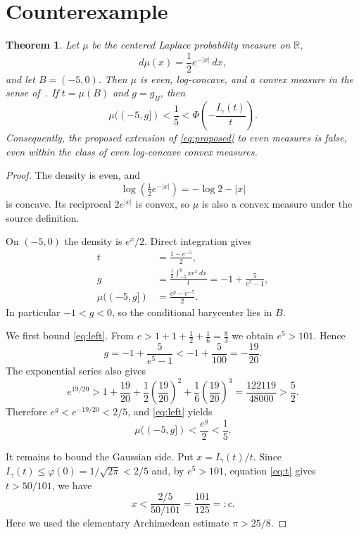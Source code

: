 \documentclass[11pt,a4paper]{article}
\newtheorem{theorem}{Theorem}
\newcommand{\R}{\mathbb R}
\newcommand{\PhiG}{\Phi}
\newcommand{\phig}{\varphi}
\begin{document}
\section{Counterexample}

\begin{theorem}\label{thm:main}
Let $\mu$ be the centered Laplace probability measure on $\R$,
\[
 d\mu(x)=\frac12 e^{-|x|}\,dx,
\]
and let $B=(-5,0)$.  Then $\mu$ is even, log-concave, and a convex measure in
the sense of~\cite{FLLMT}.  If $t=\mu(B)$ and $g=g_B$, then
\[
 \mu((-5,g])<\frac15<
 \PhiG\!\left(-\frac{I_\gamma(t)}{t}\right).
\]
Consequently, the proposed extension of \eqref{eq:proposed} to even measures
is false, even within the class of even log-concave convex measures.
\end{theorem}

\begin{proof}
The density is even, and
\[
 \log\!\left(\tfrac12e^{-|x|}\right)=-\log2-|x|
\]
is concave.  Its reciprocal $2e^{|x|}$ is convex, so $\mu$ is also a convex
measure under the source definition.

On $(-5,0)$ the density is $e^x/2$.  Direct integration gives
\begin{align}
 t&=\frac{1-e^{-5}}2,\label{eq:t}\\
 g&=\frac{\frac12\int_{-5}^{0}xe^x\,dx}{t}
   =-1+\frac{5}{e^5-1},\label{eq:g}\\
 \mu((-5,g])&=\frac{e^g-e^{-5}}2.\label{eq:left}
\end{align}
In particular $-1<g<0$, so the conditional barycenter lies in $B$.

We first bound \eqref{eq:left}.  From
$e>1+1+\frac12+\frac16=\frac83$ we obtain $e^5>101$.  Hence
\[
 g=-1+\frac5{e^5-1}< -1+\frac5{100}=-\frac{19}{20}.
\]
The exponential series also gives
\[
 e^{19/20}>
 1+\frac{19}{20}+\frac12\left(\frac{19}{20}\right)^2
 +\frac16\left(\frac{19}{20}\right)^3
 =\frac{122119}{48000}>\frac52.
\]
Therefore $e^g<e^{-19/20}<2/5$, and \eqref{eq:left} yields
\begin{equation}\label{eq:leftbound}
 \mu((-5,g])<\frac{e^g}{2}<\frac15.
\end{equation}

It remains to bound the Gaussian side.  Put
$x=I_\gamma(t)/t$.  Since $I_\gamma(t)\le\phig(0)=1/\sqrt{2\pi}<2/5$
and, by $e^5>101$, equation \eqref{eq:t} gives $t>50/101$, we have
\begin{equation}\label{eq:xbound}
 x<\frac{2/5}{50/101}=\frac{101}{125}=:c.
\end{equation}
Here we used the elementary Archimedean estimate $\pi>25/8$.


\end{proof}
\end{document}
